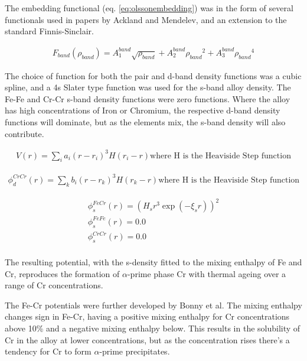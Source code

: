 The embedding functional (eq. \ref{eq:olssonembedding}) was in the form of several functionals used in papers by Ackland and Mendelev, and an extension to the standard Finnis-Sinclair.

\begin{equation}
\begin{split}
F_{band} (\rho_{band}) = A^{band}_1 \sqrt{\rho_{band}} + A^{band}_2 {\rho_{band}}^2 +  A^{band}_3 {\rho_{band}}^4 
\end{split}
\label{eq:olssonembedding}
\end{equation}

The choice of function for both the pair and d-band density functions was a cubic spline, and a 4s Slater type function was used for the s-band alloy density.  The Fe-Fe and Cr-Cr s-band density functions were zero functions.  Where the alloy has high concentrations of Iron or Chromium, the respective d-band density functions will dominate, but as the elements mix, the s-band density will also contribute.

\begin{equation}
\begin{split}
V(r) = \sum_i a_i (r-r_i)^3 H(r_i - r) \text{where H is the Heaviside Step function}
\end{split}
\label{eq:olssonembedding}
\end{equation}

\begin{equation}
\begin{split}
\phi_{d}^{CrCr}(r) = \sum_k b_i (r-r_k)^3 H(r_k - r) \text{where H is the Heaviside Step function}
\end{split}
\label{eq:olssonembedding}
\end{equation}

\begin{equation}
\begin{split}
\phi_s^{FeCr} (r) = (H_s r^3 \exp(-\xi_s r))^2 \\
\phi_s^{FeFe} (r) = 0.0 \\
\phi_s^{CrCr} (r) = 0.0 \\
\end{split}
\label{eq:olssonembedding}
\end{equation}

The resulting potential, with the s-density fitted to the mixing enthalpy of \Gls{Fe} and \Gls{Cr}, reproduces the formation of $\alpha$-prime phase Cr with thermal ageing over a range of Cr concentrations.

The Fe-Cr potentials were further developed by Bonny et al.  The mixing enthalpy changes sign in Fe-Cr, having a positive mixing \gls{enthalpy} for Cr concentrations above 10\% and a negative mixing \gls{enthalpy} below.  This results in the solubility of Cr in the alloy at lower concentrations, but as the concentration rises there's a tendency for Cr to form $\alpha$-prime precipitates\cite{bonnyfecr}.

